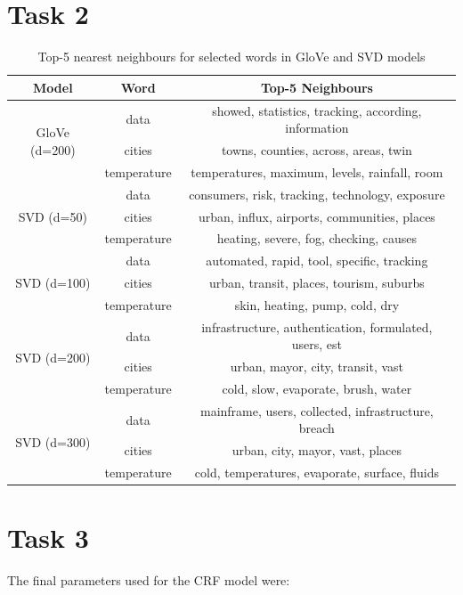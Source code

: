 \documentclass{report}
\begin{document}
\chapter{Task 2}

\begin{table}[h]
\centering
\begin{tabular}{ccc}
\hline
Model & Word & Top-5 Neighbours \\
\hline
\multirow{3}{*}{GloVe (d=200)} & data & showed, statistics, tracking, according, information \\
 & cities & towns, counties, across, areas, twin \\
 & temperature & temperatures, maximum, levels, rainfall, room \\
\hline
\multirow{3}{*}{SVD (d=50)} & data & consumers, risk, tracking, technology, exposure \\
 & cities & urban, influx, airports, communities, places \\
 & temperature & heating, severe, fog, checking, causes \\
\hline
\multirow{3}{*}{SVD (d=100)} & data & automated, rapid, tool, specific, tracking \\
 & cities & urban, transit, places, tourism, suburbs \\
 & temperature & skin, heating, pump, cold, dry \\
\hline
\multirow{3}{*}{SVD (d=200)} & data & infrastructure, authentication, formulated, users, est \\
 & cities & urban, mayor, city, transit, vast \\
 & temperature & cold, slow, evaporate, brush, water \\
\hline
\multirow{3}{*}{SVD (d=300)} & data & mainframe, users, collected, infrastructure, breach \\
 & cities & urban, city, mayor, vast, places \\
 & temperature & cold, temperatures, evaporate, surface, fluids \\
\hline
\end{tabular}
\caption{Top-5 nearest neighbours for selected words in GloVe and SVD models}
\end{table}

\chapter{Task 3}

The final parameters used for the CRF model were:
\end{document}
